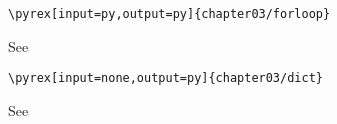 \documentclass{book}
\begin{document}
\verb|\pyrex[input=py,output=py]{chapter03/forloop}|

See 
\newpage

\verb|\pyrex[input=none,output=py]{chapter03/dict}|

See 
\end{document}
